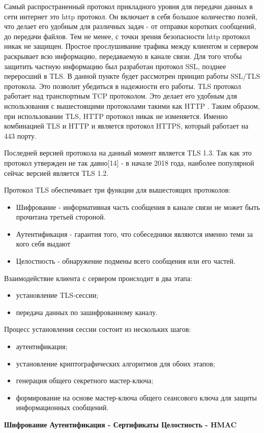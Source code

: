 Самый распространенный протокол прикладного уровня для передачи данных в сети интернет это http протокол. Он включает в себя большое количество полей, что делает его удобным для различных задач - от отправки коротких сообщений, до передачи файлов. Тем не менее, с точки зрения безопасности http протокол никак не защищен. Простое прослушивание трафика между клиентом и сервером раскрывает всю информацию, передаваемую в канале связи. Для того чтобы защитить частную информацию был разработан протокол SSL, позднее переросший в TLS. В данной пункте будет рассмотрен принцип работы SSL/TLS протокола. Это позволит убедиться в надежности его работы.
TLS протокол работает над транспортным TCP протоколом. Это делает его удобным для использования с вышестоящими протоколами такими как HTTP . Таким образом, при использовании TLS, HTTP протокол никак не изменяется. Именно комбинацией TLS и HTTP и является протокол HTTPS, который работает на 443 порту.

Последней версией протокола на данный момент является TLS 1.3. Так как это протокол утвержден не так давно[14] -  в начале 2018 года, наиболее популярной сейчас версией является TLS 1.2.

Протокол TLS обеспечивает три функции для вышестоящих протоколов:

\begin{itemize}
	\item Шифрование - информативная часть сообщения в канале связи не может быть прочитана третьей стороной.
	\item Аутентификация - гарантия того, что собеседники являются именно теми за кого себя выдают
	\item Целостность - обнаружение подмены всего сообщения или его частей.
\end{itemize}

Взаимодействие клиента с сервером происходит в два этапа:

\begin{itemize}
	\item установление TLS-сессии;
	\item передача данных по зашифрованному каналу.
\end{itemize}

Процесс установления сессии состоит из нескольких шагов:
\begin{itemize}
	\item аутентификация;
	\item установление криптографических алгоритмов для обоих этапов;
	\item генерация общего секретного мастер-ключа;
	\item формирование на основе мастер-ключа общего сеансового ключа для защиты информационных сообщений.
\end{itemize}

\textbf{Шифрование 
Аутентификация - Сертификаты
Целостность - HMAC
}